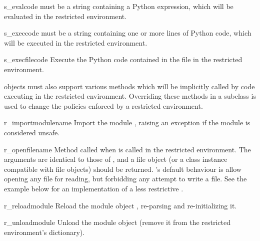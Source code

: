 \begin{methoddesc}{s_eval}{code}
 must be a string containing a Python expression, which will
be evaluated in the restricted environment.  
\end{methoddesc}

\begin{methoddesc}{s_exec}{code}
 must be a string containing one or more lines of Python code,
which will be executed in the restricted environment.  
\end{methoddesc}

\begin{methoddesc}{s_execfile}{code}
Execute the Python code contained in the file  in the
restricted environment.
\end{methoddesc}

 objects must also support various methods which will be
implicitly called by code executing in the restricted environment.
Overriding these methods in a subclass is used to change the policies
enforced by a restricted environment.

\begin{methoddesc}{r_import}{modulename}
Import the module , raising an 
exception if the module is considered unsafe.
\end{methoddesc}

\begin{methoddesc}{r_open}{filename}
Method called when  is called in the restricted
environment.  The arguments are identical to those of ,
and a file object (or a class instance compatible with file objects)
should be returned.  's default behaviour is allow opening
any file for reading, but forbidding any attempt to write a file.  See
the example below for an implementation of a less restrictive
.
\end{methoddesc}

\begin{methoddesc}{r_reload}{module}
Reload the module object , re-parsing and re-initializing it.  
\end{methoddesc}

\begin{methoddesc}{r_unload}{module}
Unload the module object  (remove it from the
restricted environment's  dictionary).
\end{methoddesc}

